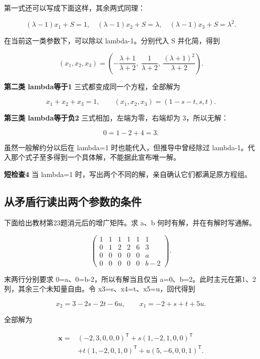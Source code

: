 \documentclass[
  11pt,
  a4paper,
  fontset=fandol]{ctexart}
\begin{document}
第一式还可以写成下面这样，其余两式同理：

\[(\lambda-1)x_1+S=1,\quad
(\lambda-1)x_2+S=\lambda,\quad
(\lambda-1)x_3+S=\lambda^2.\]

在当前这一类参数下，可以除以 lambda-1。分别代入 S 并化简，得到

\[\boxed{(x_1,x_2,x_3)=
\left(-\frac{\lambda+1}{\lambda+2},\
\frac1{\lambda+2},\
\frac{(\lambda+1)^2}{\lambda+2}\right).}\]

\textbf{第二类 lambda等于1} 三式都变成同一个方程，全部解为

\[x_1+x_2+x_3=1,
\qquad (x_1,x_2,x_3)=(1-s-t,s,t).\]

\textbf{第三类 lambda等于负2} 三式相加，左端为零，右端却为 3，所以无解：

\[0=1-2+4=3.\]

虽然一般解约分以后在 lambda=1 时也能代入，但推导中曾经除过
lambda-1。代入那个式子至多得到一个具体解，不能据此宣布唯一解。

\textbf{短检查4} 当 lambda=1
时，写出两个不同的解，亲自确认它们都满足原方程组。


\subsection{从矛盾行读出两个参数的条件}\label{ux4eceux77dbux76feux884cux8bfbux51faux4e24ux4e2aux53c2ux6570ux7684ux6761ux4ef6}

下面给出教材第23题消元后的增广矩阵。求 a、b 何时有解，并在有解时写通解。

\[\left(\begin{array}{rrrrr|r}
1&1&1&1&1&1\\
0&1&2&2&6&3\\
0&0&0&0&0&a\\
0&0&0&0&0&b-2
\end{array}\right).\]

末两行分别要求 0=a、0=b-2，所以有解当且仅当
a=0、b=2。此时主元在第1、2列，其余三个未知量自由。令
x3=s、x4=t、x5=u，回代得到

\[x_2=3-2s-2t-6u,\qquad x_1=-2+s+t+5u.\]

全部解为

\[\begin{aligned}
\boldsymbol x={}&(-2,3,0,0,0)^{\mathsf T}
+s(1,-2,1,0,0)^{\mathsf T}\\
&+t(1,-2,0,1,0)^{\mathsf T}
+u(5,-6,0,0,1)^{\mathsf T}.
\end{aligned}\]
\end{document}
